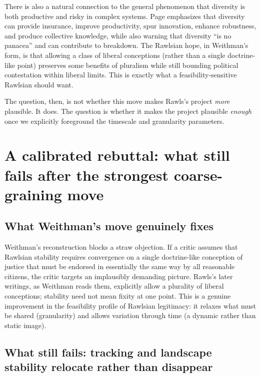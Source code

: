 \documentclass[12pt]{report}
\begin{document}
There is also a natural connection to the general phenomenon that diversity is both productive and risky in complex systems. Page emphasizes that diversity can provide insurance, improve productivity, spur innovation, enhance robustness, and produce collective knowledge, while also warning that diversity ``is no panacea'' and can contribute to breakdown. \parencite[p.~3]{page2011diversity} The Rawlsian hope, in Weithman’s form, is that allowing a class of liberal conceptions (rather than a single doctrine-like point) preserves some benefits of pluralism while still bounding political contestation within liberal limits. This is exactly what a feasibility-sensitive Rawlsian should want.

The question, then, is not whether this move makes Rawls’s project \emph{more} plausible. It does. The question is whether it makes the project plausible \emph{enough} once we explicitly foreground the timescale and granularity parameters.

\section{A calibrated rebuttal: what still fails after the strongest coarse-graining move}

\subsection{What Weithman’s move genuinely fixes}

Weithman’s reconstruction blocks a straw objection. If a critic assumes that Rawlsian stability requires convergence on a single doctrine-like conception of justice that must be endorsed in essentially the same way by all reasonable citizens, the critic targets an implausibly demanding picture. Rawls’s later writings, as Weithman reads them, explicitly allow a plurality of liberal conceptions; stability need not mean fixity at one point. \parencite[pp.~205--206]{Weithman2023FixedPoints} This is a genuine improvement in the feasibility profile of Rawlsian legitimacy: it relaxes what must be shared (granularity) and allows variation through time (a dynamic rather than static image).

\subsection{What still fails: tracking and landscape stability relocate rather than disappear}
\end{document}
